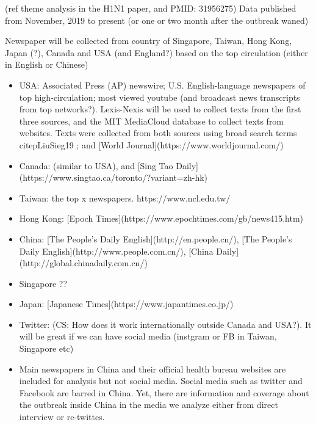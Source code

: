 
(ref theme analysis in the H1N1 paper, and PMID: 31956275) Data published from November, 2019 to present (or one or two month after the outbreak waned)

Newspaper will be collected from country of Singapore, Taiwan, Hong Kong, Japan (?), Canada and USA (and England?) based on the top circulation (either in English or Chinese)
\begin{itemize}
\item{USA: Associated Press (AP) newswire; U.S. English-language newspapers of top high-circulation; most viewed youtube (and broadcast news transcripts from top networks?).  Lexis-Nexis will be used to collect texts from the first three sources, and the MIT MediaCloud database to collect texts from websites. Texts were collected from both sources using broad search terms citep{LiuSieg19} ; and [World Journal](https://www.worldjournal.com/)}
\item{Canada: (similar to USA), and [Sing Tao Daily](https://www.singtao.ca/toronto/?variant=zh-hk)}
\item{Taiwan: the top x newspapers. https://www.ncl.edu.tw/}
\item{Hong Kong: [Epoch Times](https://www.epochtimes.com/gb/news415.htm)}
\item{China:  [The People’s Daily English](http://en.people.cn/), [The People’s Daily English](http://www.people.com.cn/), [China Daily](http://global.chinadaily.com.cn/)}
\item{Singapore ??}
\item{Japan: [Japanese Times](https://www.japantimes.co.jp/)}
\item{Twitter: (CS:  How does it work internationally outside Canada and USA?).  It will be great if we can have social media (instgram or FB in Taiwan, Singapore etc)}
\item{Main newspapers in China and their official health bureau websites are included for analysis but not social media.   Social media such as twitter and Facebook are barred in China. Yet, there are information and coverage about the outbreak inside China in the media we analyze either from direct interview or re-twittes. }
\end{itemize}


